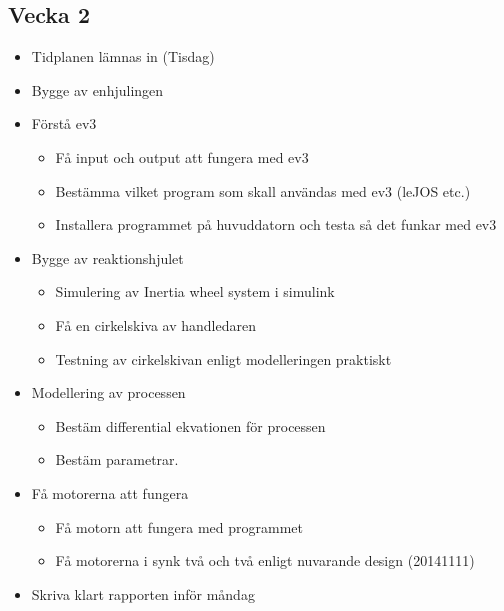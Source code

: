 \documentclass[a4paper]{article}
\begin{document}
	\subsection*{Vecka 2}
	\begin{itemize}
    		\item Tidplanen lämnas in (Tisdag)
    		\item Bygge av enhjulingen
		\item Förstå ev3
	\begin{itemize}
		\item Få input och output att fungera med ev3
		\item Bestämma vilket program som skall användas med ev3 (leJOS etc.)
		\item Installera programmet på huvuddatorn och testa så det funkar med ev3
	\end{itemize}

		
    		\item Bygge av reaktionshjulet
    	
    	\begin{itemize}
    \item Simulering av Inertia wheel system i simulink
    		\item Få en cirkelskiva av handledaren
		\item Testning av cirkelskivan enligt modelleringen praktiskt
    	\end{itemize}
    \item Modellering av processen
    		\begin{itemize}
			\item Bestäm differential ekvationen för processen
    			\item Bestäm parametrar.
		\end{itemize}        
	
	\item Få motorerna att fungera
	\begin{itemize}
		\item Få motorn att fungera med programmet
		\item Få motorerna i synk två och två enligt nuvarande design (20141111)
	\end{itemize}
	
	\item Skriva klart rapporten inför måndag
	
	\end{itemize}
	
	

	
    
\end{document}
